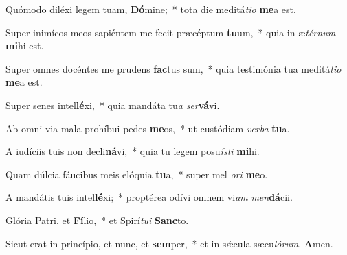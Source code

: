 \item Quómodo diléxi legem tuam, \textbf{Dó}mine;~* tota die meditá\textit{tio} \textbf{me}a est.

\item Super inimícos meos sapiéntem me fecit præcéptum \textbf{tu}um,~* quia in æ\textit{térnum} \textbf{mi}hi est.

\item Super omnes docéntes me prudens \textbf{fac}tus sum,~* quia testimónia tua meditá\textit{tio} \textbf{me}a est.

\item Super senes intel\textbf{lé}xi,~* quia mandáta tu\textit{a} \textit{ser}\textbf{vá}vi.

\item Ab omni via mala prohíbui pedes \textbf{me}os,~* ut custódiam \textit{verba} \textbf{tu}a.

\item A iudíciis tuis non decli\textbf{ná}vi,~* quia tu legem posu\textit{ísti} \textbf{mi}hi.

\item Quam dúlcia fáucibus meis elóquia \textbf{tu}a,~* super mel \textit{ori} \textbf{me}o.

\item A mandátis tuis intel\textbf{lé}xi;~* proptérea odívi omnem vi\textit{am} \textit{men}\textbf{dá}cii.

\item Glória Patri, et \textbf{Fí}lio,~* et Spirí\textit{tui} \textbf{Sanc}to.

\item Sicut erat in princípio, et nunc, et \textbf{sem}per,~* et in sǽcula sæcu\textit{lórum}. \textbf{A}men.